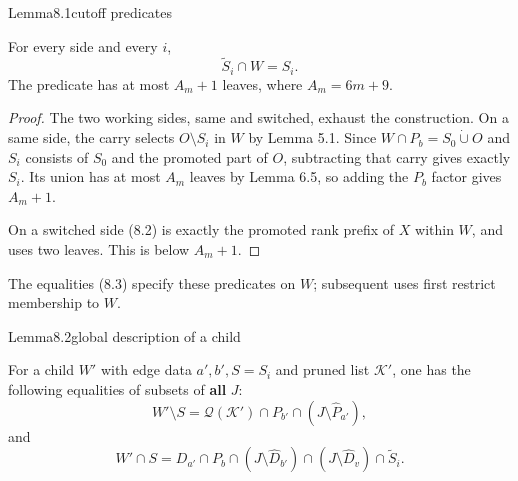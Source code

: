 \begin{numbered}{Lemma}{8.1}{cutoff predicates}

For every side and every \(i\), \[
\widetilde S_i\cap W=S_i.
\tag{8.3}
\] The predicate has at most \(A_m+1\) leaves, where \(A_m=6m+9\).

\end{numbered}

\begin{proof}
The two working sides, same and switched, exhaust the construction. On a same side, the carry selects \(O\setminus S_i\) in \(W\) by Lemma 5.1. Since \(W\cap P_b=S_0\dot\cup O\) and \(S_i\) consists of \(S_0\) and the promoted part of \(O\), subtracting that carry gives exactly \(S_i\). Its union has at most \(A_m\) leaves by Lemma 6.5, so adding the \(P_b\) factor gives \(A_m+1\).

On a switched side (8.2) is exactly the promoted rank prefix of \(X\) within \(W\), and uses two leaves. This is below \(A_m+1\).
\end{proof}

The equalities (8.3) specify these predicates on \(W\); subsequent uses first restrict membership to \(W\).

\begin{numbered}{Lemma}{8.2}{global description of a child}

For a child \(W'\) with edge data \(a',b',S=S_i\) and pruned list \(\mathcal K'\), one has the following equalities of subsets of \textbf{all} \(J\): \[
W'\setminus S
=
\mathcal Q(\mathcal K')
\cap P_{b'}
\cap(J\setminus\widehat P_{a'}),
\tag{8.4}
\] and \[
W'\cap S
=
D_{a'}
\cap P_b
\cap(J\setminus\widehat D_{b'})
\cap(J\setminus\widehat D_v)
\cap\widetilde S_i.
\tag{8.5}
\]

\end{numbered}

